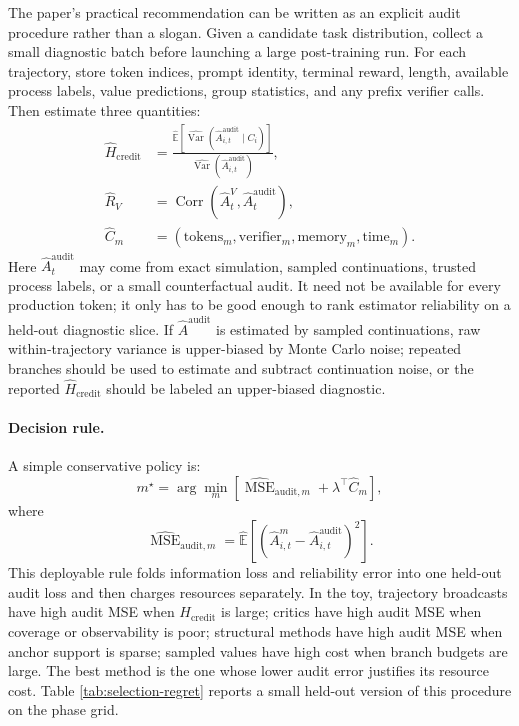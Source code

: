\documentclass[11pt]{article}
\newcommand{\E}{\mathbb{E}}
\begin{document}
The paper's practical recommendation can be written as an explicit audit
procedure rather than a slogan. Given a candidate task distribution, collect a
small diagnostic batch before launching a large post-training run. For each
trajectory, store token indices, prompt identity, terminal reward, length,
available process labels, value predictions, group statistics, and any prefix
verifier calls. Then estimate three quantities:
\begin{align}
\widehat H_{\mathrm{credit}}
&=
\frac{
  \widehat{\E}\!\left[
    \widehat{\operatorname{Var}}
    \left(\widehat A^{\mathrm{audit}}_{i,t}\mid C_i\right)
  \right]
}{
  \widehat{\operatorname{Var}}\!\left(\widehat A^{\mathrm{audit}}_{i,t}\right)
},\\
\widehat R_V
&=
\operatorname{Corr}(\widehat A^V_t,\widehat A^{\mathrm{audit}}_t),\\
\widehat C_m
&=
(\mathrm{tokens}_m,\mathrm{verifier}_m,\mathrm{memory}_m,\mathrm{time}_m).
\end{align}
Here $\widehat A^{\mathrm{audit}}_t$ may come from exact simulation, sampled
continuations, trusted process labels, or a small counterfactual audit. It need
not be available for every production token; it only has to be good enough to
rank estimator reliability on a held-out diagnostic slice. If
$\widehat A^{\mathrm{audit}}$ is estimated by sampled continuations, raw
within-trajectory variance is upper-biased by Monte Carlo noise; repeated
branches should be used to estimate and subtract continuation noise, or the
reported $\widehat H_{\mathrm{credit}}$ should be labeled an upper-biased
diagnostic.

\paragraph{Decision rule.}
A simple conservative policy is:
\begin{equation}
m^\star =
\arg\min_m
\left[
\widehat{\operatorname{MSE}}_{\mathrm{audit},m}
+ \lambda^\top \widehat C_m
\right],
\end{equation}
where
\begin{equation}
\widehat{\operatorname{MSE}}_{\mathrm{audit},m}
=
\widehat{\E}\!\left[
\left(
\widehat A^{m}_{i,t}-\widehat A^{\mathrm{audit}}_{i,t}
\right)^2
\right].
\end{equation}
This deployable rule folds information loss and reliability error into one
held-out audit loss and then charges resources separately. In the toy,
trajectory broadcasts have high audit MSE when $H_{\mathrm{credit}}$ is large;
critics have high audit MSE when coverage or observability is poor; structural
methods have high audit MSE when anchor support is sparse; sampled values have
high cost when branch budgets are large. The best method is the one whose lower
audit error justifies its resource cost. Table \ref{tab:selection-regret}
reports a small held-out version of this procedure on the phase grid.
\end{document}
